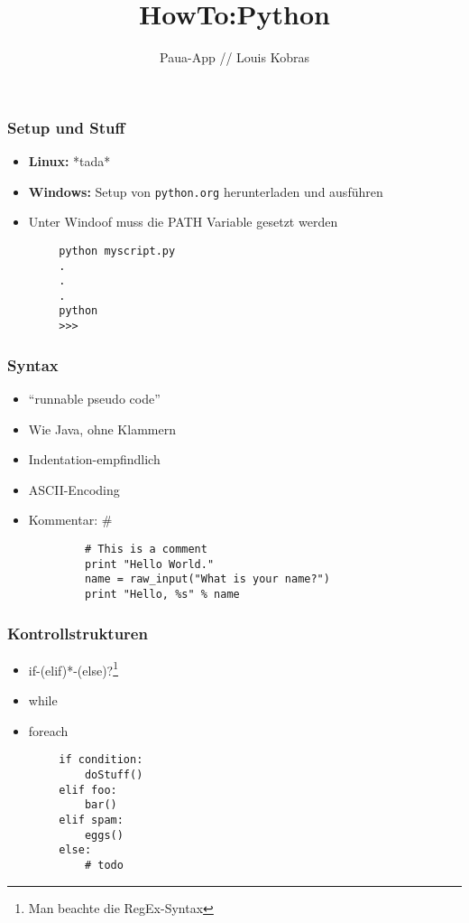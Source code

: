 \documentclass{beamer}
\title{HowTo:Python}
\author{Paua-App // Louis Kobras}
\begin{document}
\begin{frame}
	\maketitle
\end{frame}
\begin{frame}[fragile]
	\frametitle{Setup und Stuff}
	\begin{itemize}
		\item \textbf{Linux:} *tada*
		\item \textbf{Windows:} Setup von \texttt{python.org} herunterladen und ausführen
		\item Unter Windoof muss die PATH Variable gesetzt werden
	\end{itemize}
	\pause
	\begin{lstlisting}
		python myscript.py
		.
		.
		.
		python
		>>>
	\end{lstlisting}
\end{frame}
\begin{frame}[fragile]
	\frametitle{Syntax}
	\begin{itemize}
		\item ``runnable pseudo code''
		\item Wie Java, ohne Klammern
		\item Indentation-empfindlich
		\item ASCII-Encoding
		\item Kommentar: \#
	\end{itemize}
	\pause
		\begin{lstlisting}
			# This is a comment
			print "Hello World."
			name = raw_input("What is your name?")
			print "Hello, %s" % name
		\end{lstlisting}
\end{frame}


\begin{frame}[fragile]
	\frametitle{Kontrollstrukturen}
	\begin{itemize}
		\item if-(elif)*-(else)?\footnote{Man beachte die RegEx-Syntax}
		\item while
		\item foreach
	\end{itemize}
	\pause
	\begin{lstlisting}
		if condition:
    		doStuff()
		elif foo:
		    bar()
		elif spam:
		    eggs()
		else:
		    # todo
	\end{lstlisting}
\end{frame}
\end{document}
